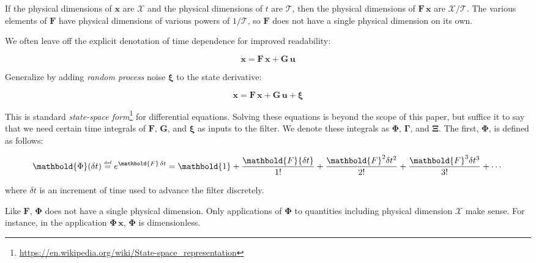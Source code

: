 \documentclass[10pt,oneside,x11names]{article}
\begin{document}
If the physical dimensions of \(\mathbold{x}\) are \(\mathcal{X}\) and the physical
dimensions of \(t\) are \(\mathcal{T}\), then the physical dimensions
of \(\mathbold{F}\,\mathbold{x}\) are \(\mathcal{X}/\mathcal{T}\). The various
elements of \(\mathbold{F}\) have physical dimensions of various powers of
\(1/\mathcal{T}\), so \(\mathbold{F}\) does not have a single physical dimension on
its own.

We often leave off the explicit denotation of time dependence for improved readability:

\begin{equation*}
{\dot{\mathbold{x}}}=\mathbold{F}\,\mathbold{x}+\mathbold{G}\,\mathbold{u}
\end{equation*}

Generalize by adding \emph{random process} noise \(\mathbold{\xi}\) to the state
derivative:

\begin{equation}
\label{eqn:state-space-form}
{\dot{\mathbold{x}}}=
\mathbold{F}\,\mathbold{x}+
\mathbold{G}\,\mathbold{u}+
\mathbold{\xi}
\end{equation}

This is standard \emph{state-space form}\footnote{\url{https://en.wikipedia.org/wiki/State-space\_representation}} for
differential equations. Solving these equations is beyond the scope of
this paper, but suffice it to say that we need certain time integrals of
\(\mathbold{F}\), \(\mathbold{G}\), and \(\mathbold{\xi}\) as inputs to the filter.
We denote these integrals as \(\mathbold{\Phi}\), \(\mathbold{\Gamma}\), and
\(\mathbold{\Xi}\). The first, \(\mathbold{\Phi}\), is defined as follows:

\begin{equation}
\label{eqn:definition-of-Phi}
\mathbold{\Phi}(\delta t)\stackrel{\text{\tiny def}}{=}
e^{\mathbold{F}\,{\delta t}}=
\mathbold{1}+
\frac{\mathbold{F}  {\delta t  }}{1!}+
\frac{\mathbold{F}^2{\delta t^2}}{2!}+
\frac{\mathbold{F}^3{\delta t^3}}{3!}+
\cdots
\end{equation}

\noindent where \(\delta t\) is an increment of time used to advance the filter
discretely.

Like \(\mathbold{F}\), \(\mathbold{\Phi}\) does not have a single 
physical dimension.
Only applications of \(\mathbold{\Phi}\) to quantities including physical dimension
\(\mathcal{X}\) make sense. For instance, in the application
\(\mathbold{\Phi}\,\mathbold{x}\), \(\mathbold{\Phi}\) is dimensionless.
\end{document}
